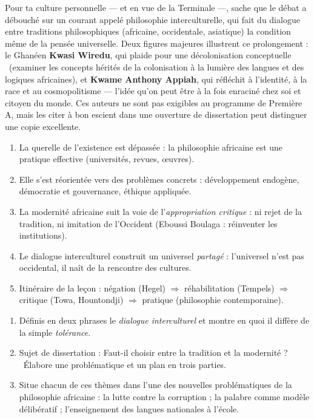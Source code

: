 \documentclass[11pt]{article}
\newcommand{\cle}[1]{{\popxbold\color{popdark}#1}}
\begin{document}
Pour ta culture personnelle — et en vue de la Terminale —, sache que le débat a débouché sur un courant appelé \cle{philosophie interculturelle}, qui fait du dialogue entre traditions philosophiques (africaine, occidentale, asiatique) la condition même de la pensée universelle. Deux figures majeures illustrent ce prolongement : le Ghanéen \textbf{Kwasi Wiredu}, qui plaide pour une \guillemotleft décolonisation conceptuelle \guillemotright\ (examiner les concepts hérités de la colonisation à la lumière des langues et des logiques africaines), et \textbf{Kwame Anthony Appiah}, qui réfléchit à l'identité, à la race et au cosmopolitisme — l'idée qu'on peut être à la fois enraciné chez soi et citoyen du monde. Ces auteurs ne sont pas exigibles au programme de Première A, mais les citer à bon escient dans une ouverture de dissertation peut distinguer une copie excellente.

\begin{aretenir}
\begin{enumerate}
\item La querelle de l'existence est dépassée : la philosophie africaine est une pratique effective (universités, revues, œuvres).
\item Elle s'est réorientée vers des problèmes concrets : développement endogène, démocratie et gouvernance, éthique appliquée.
\item La modernité africaine suit la voie de l'\emph{appropriation critique} : ni rejet de la tradition, ni imitation de l'Occident (Eboussi Boulaga : réinventer les institutions).
\item Le dialogue interculturel construit un universel \emph{partagé} : l'universel n'est pas occidental, il naît de la rencontre des cultures.
\item Itinéraire de la leçon : négation (Hegel) $\Rightarrow$ réhabilitation (Tempels) $\Rightarrow$ critique (Towa, Hountondji) $\Rightarrow$ pratique (philosophie contemporaine).
\end{enumerate}
\end{aretenir}

\begin{exercice}
\begin{enumerate}
\item Définis en deux phrases le \emph{dialogue interculturel} et montre en quoi il diffère de la simple \emph{tolérance}.
\item Sujet de dissertation : \guillemotleft Faut-il choisir entre la tradition et la modernité ? \guillemotright\ Élabore une problématique et un plan en trois parties.
\item Situe chacun de ces thèmes dans l'une des nouvelles problématiques de la philosophie africaine : la lutte contre la corruption ; la palabre comme modèle délibératif ; l'enseignement des langues nationales à l'école.
\end{enumerate}
\end{exercice}
\end{document}
